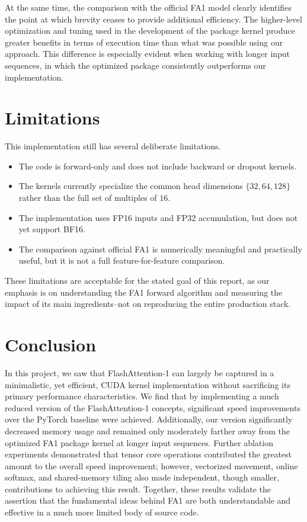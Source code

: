 \documentclass{article}
\begin{document}
At the same time, the comparison with the official FA1 model clearly identifies the point at which brevity ceases to provide additional efficiency. The higher-level optimization and tuning used in the development of the package kernel produce greater benefits in terms of execution time than what was possible using our approach. This difference is especially evident when working with longer input sequences, in which the optimized package consistently outperforms our implementation.

\section{Limitations}
This implementation still has several deliberate limitations.
\begin{itemize}
    \item The code is forward-only and does not include backward or dropout kernels.
    \item The kernels currently specialize the common head dimensions $\{32, 64, 128\}$ rather than the full set of multiples of $16$.
    \item The implementation uses FP16 inputs and FP32 accumulation, but does not yet support BF16.
    \item The comparison against official FA1 is numerically meaningful and practically useful, but it is not a full feature-for-feature comparison.
\end{itemize}
These limitations are acceptable for the stated goal of this report, as our emphasis is on understanding the FA1 forward algorithm and measuring the impact of its main ingredients--not on reproducing the entire production stack.

\section{Conclusion}
In this project, we saw that FlashAttention-1 can largely be captured in a minimalistic, yet efficient, CUDA kernel implementation without sacrificing its primary performance characteristics. We find that by implementing a much reduced version of the FlashAttention-1 concepts, significant speed improvements over the PyTorch baseline were achieved. Additionally, our version significantly decreased memory usage and remained only moderately farther away from the optimized FA1 package kernel at longer input sequences.
Further ablation experiments demonstrated that tensor core operations contributed the greatest amount to the overall speed improvement; however, vectorized movement, online softmax, and shared-memory tiling also made independent, though smaller, contributions to achieving this result.
Together, these results validate the assertion that the fundamental ideas behind FA1 are both understandable and effective in a much more limited body of source code.
\end{document}
